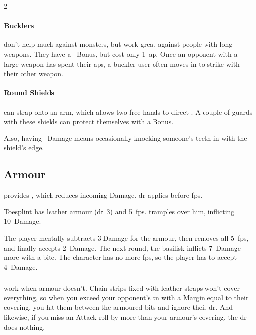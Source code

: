 \begin{multicols}{2}
\buckler
\paragraph{Bucklers}
don't help much against \glspl{monster}, but work great against people with long weapons.
They have a ~Bonus, but cost only 1~\gls{ap}.
Once an opponent with a large weapon has spent their \glspl{ap}, a buckler user often moves in to strike with their other weapon.

\roundshield
\paragraph{Round Shields}
can strap onto an arm, which allows two free hands to direct .
A couple of \glspl{guard} with these shields can protect themselves with a  Bonus.

Also, having ~Damage means occasionally knocking someone's teeth in with the shield's edge.

\shieldchart

\armourExample

\subsection{Armour}
\label{armour}

 provides , which reduces incoming Damage.
\Gls{dr} applies before \glspl{fp}.

\begin{exampletext}
  Toesplint has leather armour (\gls{dr}~3) and 5~\glspl{fp}.
   tramples over him, inflicting 10~Damage.

  The player mentally subtracts 3 Damage for the armour, then removes all 5~\glspl{fp}, and finally accepts 2~Damage.
  The next \gls{round}, the \gls{basilisk} inflicts 7~Damage more with a bite.
  The character has no more \glspl{fp}, so the player has to accept 4~Damage.
\end{exampletext}

\subsubsection{}
\label{vitals}
work when armour doesn't.  Chain strips fixed with leather straps won't cover
everything, so when you exceed your opponent's \gls{tn} with a Margin equal to
their \gls{covering}, you hit them between the armoured bits and ignore their
\gls{dr}.  And likewise, if you miss an Attack roll by more than your armour's
\gls{covering}, the \gls{dr} does nothing.


\end{multicols}
